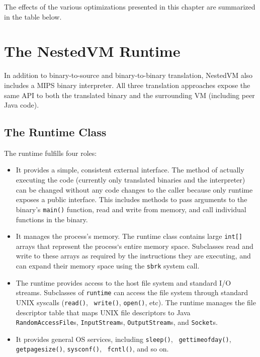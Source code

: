 \documentclass{acmconf}
\begin{document}
The effects of the various optimizations presented in this chapter are
summarized in the table below.



\section{The NestedVM Runtime}

In addition to binary-to-source and binary-to-binary translation,
NestedVM also includes a MIPS binary interpreter.  All three
translation approaches expose the same API to both the translated
binary and the surrounding VM (including peer Java code).

\subsection{The Runtime Class}

The runtime fulfills four roles:

\begin{itemize}
      
\item It provides a simple, consistent external interface.  The method
      of actually executing the code (currently only translated
      binaries and the interpreter) can be changed without any code
      changes to the caller because only runtime exposes a public
      interface.  This includes methods to pass arguments to the
      binary's {\tt main()} function, read and write from memory, and
      call individual functions in the binary.
      
\item It manages the process's memory.  The runtime class contains
      large {\tt int[]} arrays that represent the process`s entire
      memory space.  Subclasses read and write to these arrays as
      required by the instructions they are executing, and can expand
      their memory space using the {\tt sbrk} system call.
      
\item The runtime provides access to the host file system and standard
      I/O streams.  Subclasses of {\tt runtime} can access the file
      system through standard UNIX syscalls ({\tt read()}, {\tt
      write()}, {\tt open()}, etc).  The runtime manages the file
      descriptor table that maps UNIX file descriptors to Java {\tt
      RandomAccessFile}s, {\tt InputStream}s, {\tt OutputStream}s, and
      {\tt Socket}s.
      
\item It provides general OS services, including {\tt sleep()}, {\tt
      gettimeofday()}, {\tt getpagesize()}, {\tt sysconf()}, {\tt
      fcntl()}, and so on.
      
\end{itemize}
\end{document}
